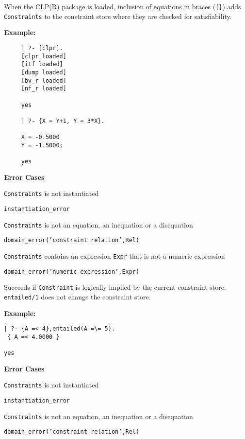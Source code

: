 \begin{description}
%
When the CLP(R) package is loaded, inclusion of equations in braces
({\tt \{\}}) adds {\tt Constraints} to the constraint store where they
are checked for satisfiability. 

{\bf Example:}
{\small
\begin{verbatim}
     | ?- [clpr].
     [clpr loaded]
     [itf loaded]
     [dump loaded]
     [bv_r loaded]
     [nf_r loaded]

     yes

     | ?- {X = Y+1, Y = 3*X}.

     X = -0.5000
     Y = -1.5000;

     yes
\end{verbatim}
}
{\bf Error Cases}
\bi
\item 	{\tt Constraints} is not instantiated
\bi
\item 	{\tt instantiation\_error}
\ei
%
\item 	{\tt Constraints} is not an equation, an inequation or a disequation
\bi
\item 	{\tt domain\_error('constraint relation',Rel)}
\ei
\item {\tt Constraints} contains an expression {\tt Expr} that is not
  a numeric expression 
\bi
\item 	{\tt domain\_error('numeric expression',Expr)}
\ei
\ei

%
Succeeds if {\tt Constraint} is logically implied by the current
constraint store.  {\tt entailed/1} does not change the constraint
store.
%

{\bf Example:}
{\small
\begin{verbatim}
| ?- {A =< 4},entailed(A =\= 5).
 { A =< 4.0000 }

yes   
\end{verbatim}
}
{\bf Error Cases}
\bi
\item 	{\tt Constraints} is not instantiated
\bi
\item 	{\tt instantiation\_error}
\ei
%
\item 	{\tt Constraints} is not an equation, an inequation or a disequation
\bi
\item 	{\tt domain\_error('constraint relation',Rel)}
\ei
\ei




\end{description}
